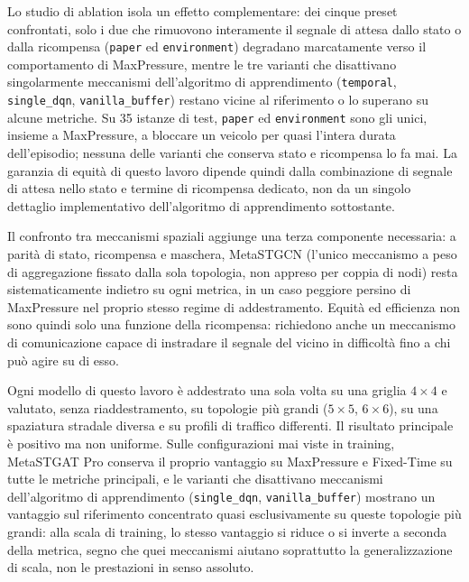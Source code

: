 Lo studio di ablation isola un effetto complementare: dei cinque preset
confrontati, solo i due che rimuovono interamente il segnale di attesa
dallo stato o dalla ricompensa (\texttt{paper} ed \texttt{environment})
degradano marcatamente verso il comportamento di MaxPressure, mentre le
tre varianti che disattivano singolarmente meccanismi dell'algoritmo di
apprendimento (\texttt{temporal}, \texttt{single\_dqn},
\texttt{vanilla\_buffer}) restano vicine al riferimento o lo superano su
alcune metriche. Su 35 istanze di test, \texttt{paper} ed
\texttt{environment} sono gli unici, insieme a MaxPressure, a bloccare un
veicolo per quasi l'intera durata dell'episodio; nessuna delle varianti
che conserva stato e ricompensa lo fa mai. La garanzia di equità di questo
lavoro dipende quindi dalla combinazione di segnale di attesa nello stato
e termine di ricompensa dedicato, non da un singolo dettaglio
implementativo dell'algoritmo di apprendimento sottostante.

Il confronto tra meccanismi spaziali aggiunge una terza componente
necessaria: a parità di stato, ricompensa e maschera, MetaSTGCN (l'unico
meccanismo a peso di aggregazione fissato dalla sola topologia, non
appreso per coppia di nodi) resta sistematicamente indietro su ogni
metrica, in un caso peggiore persino di MaxPressure nel proprio stesso
regime di addestramento. Equità ed efficienza non sono quindi solo una
funzione della ricompensa: richiedono anche un meccanismo di
comunicazione capace di instradare il segnale del vicino in difficoltà
fino a chi può agire su di esso.

Ogni modello di questo lavoro è addestrato una sola volta su una griglia
$4\times4$ e valutato, senza riaddestramento, su topologie più grandi
($5\times5$, $6\times6$), su una spaziatura stradale diversa e su profili
di traffico differenti. Il risultato principale è positivo ma non
uniforme. Sulle configurazioni mai viste in training, MetaSTGAT Pro
conserva il proprio vantaggio su MaxPressure e Fixed-Time su tutte le
metriche principali, e le varianti che disattivano meccanismi
dell'algoritmo di apprendimento (\texttt{single\_dqn},
\texttt{vanilla\_buffer}) mostrano un vantaggio sul riferimento
concentrato quasi esclusivamente su queste topologie più grandi: alla
scala di training, lo stesso vantaggio si riduce o si inverte a seconda
della metrica, segno che quei meccanismi aiutano soprattutto la
generalizzazione di scala, non le prestazioni in senso assoluto.

